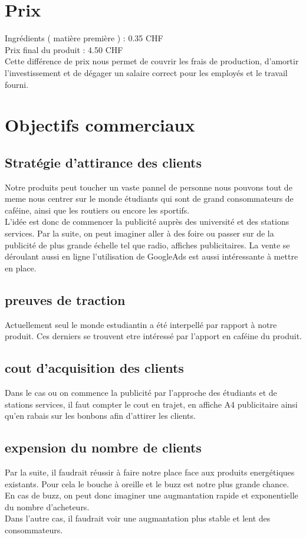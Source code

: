 \documentclass{article}
\begin{document}
\section{Prix}
Ingrédients ( matière première ) : 0.35 CHF \\
Prix final du produit :  4.50 CHF\\

Cette différence de prix nous permet de couvrir les frais de production, d'amortir l'investissement et de dégager un salaire correct pour les employés et le travail fourni.

\section{Objectifs commerciaux}
\subsection{Stratégie d'attirance des clients}
Notre produits peut toucher un vaste pannel de personne nous pouvons tout de meme
nous centrer sur le monde étudiants qui sont de grand consommateurs de caféine, ainsi que les routiers ou encore les sportifs.\\
L'idée est donc de commencer la publicité auprès des université et des stations services. Par la suite, on peut imaginer aller à des
foire ou passer sur de la publicité de plus grande échelle tel que radio, affiches publicitaires. La  vente se déroulant aussi en ligne l'utilisation de GoogleAds est aussi intéressante à mettre en place.
\subsection{preuves de traction}
Actuellement seul le monde estudiantin a été interpellé par rapport à notre produit. Ces derniers se trouvent etre intéressé par l'apport en caféine du produit.
\subsection{cout d'acquisition des clients}
Dans le cas ou on commence la publicité par l'approche des étudiants et de stations services, il faut compter le cout en trajet, en affiche A4 publicitaire ainsi qu'en rabais sur les bonbons afin d'attirer les clients.

\subsection{expension du nombre de clients}
Par la suite, il faudrait réussir à faire notre place face aux produits energétiques existants. Pour cela le bouche à oreille et le buzz est notre plus grande chance.\\
En cas de buzz, on peut donc imaginer une augmantation rapide et exponentielle du nombre d'acheteurs.\\
Dans l'autre cas, il faudrait voir une augmantation plus stable et lent des consommateurs.
\end{document}
